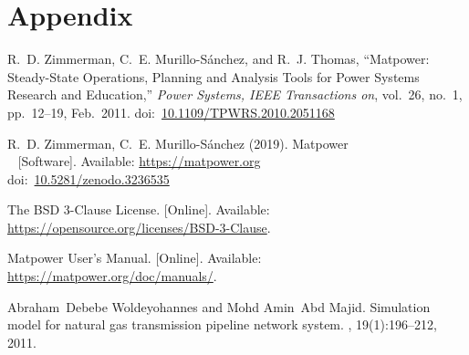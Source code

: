 \documentclass[12pt,a4paper,oneside]{book}
\newcommand{\matpower}[0]{{\sc Matpower}}
\newcommand{\doi}[1]{doi:~\href{https://doi.org/#1}{#1}}
\begin{document}
	
	\tableofcontents                            
	\listoffigures
	\listoftables	
	
	
	
	
	
	\part*{Appendix}
		
	
	\clearpage	
	\begin{thebibliography}{99}
	R.~D. Zimmerman, C.~E. Murillo-S{\'a}nchez, and R.~J. Thomas, ``\matpower{}: Steady-State Operations, Planning and Analysis Tools for Power Systems Research and Education,'' \emph{Power Systems, IEEE Transactions on}, vol.~26, no.~1, pp.~12--19, Feb.~2011.
	\doi{10.1109/TPWRS.2010.2051168}
	
	R.~D. Zimmerman, C.~E. Murillo-S{\'a}nchez (2019). \matpower{}\\~
	[Software]. Available: \url{https://matpower.org}\\
	\doi{10.5281/zenodo.3236535}
	
	The BSD 3-Clause License. [Online]. Available: \url{https://opensource.org/licenses/BSD-3-Clause}.
	
	\matpower{} User's Manual. [Online]. Available: \url{https://matpower.org/doc/manuals/}.
	
	Abraham~Debebe Woldeyohannes and Mohd Amin~Abd Majid.
	\newblock Simulation model for natural gas transmission pipeline network
	system.
	, 19(1):196--212, 2011.		
    \end{thebibliography}	
\end{document}

